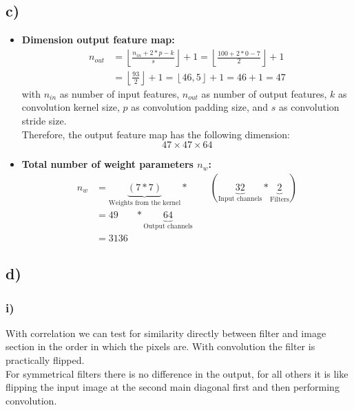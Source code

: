 \documentclass[a4paper]{article}
\begin{document}
\newpage
    \subsection*{c)}
        \begin{itemize}
            \item \textbf{Dimension output feature map:}\\
                \begin{align}
                    n_{out} &= \left\lfloor \frac{n_{in} + 2*p - k}{s} \right\rfloor + 1
                    = \left\lfloor \frac{100 + 2*0 - 7}{2} \right\rfloor + 1\\
                    &= \left\lfloor \frac{93}{2} \right\rfloor + 1
                    = \left\lfloor 46,5 \right\rfloor + 1 = 46 + 1 = 47
                \end{align}
                with $n_{in}$ as number of input features, $n_{out}$ as number of output features, $k$ as convolution kernel size, 
                $p$ as convolution padding size, and $s$ as convolution stride size.\\
                Therefore, the output feature map has the following dimension:
                $$47 \times 47 \times 64$$
            
            \item \textbf{Total number of weight parameters $n_w$:}\\
                \begin{align}
                    n_w &= \underbrace{(7 * 7)}_{\text{Weights from the kernel}} *\ \ \ \ \ \ \ \ \ \  (\underbrace{32}_{\text{Input channels}} * \underbrace{2}_{\text{Filters}})\\ 
                    &= 49\ \ \ \ \ \ \ \  * \underbrace{64}_{\text{Output channels}}\\ 
                    &= 3136
                \end{align}

        \end{itemize}

    \subsection*{d)}
        \subsubsection*{i)}
            With correlation we can test for similarity directly between filter and image section in the order in which the pixels are. With convolution the filter is practically flipped.\\
            For symmetrical filters there is no difference in the output, for all others it is like flipping the input image at the second main diagonal first and then performing convolution.
\end{document}
